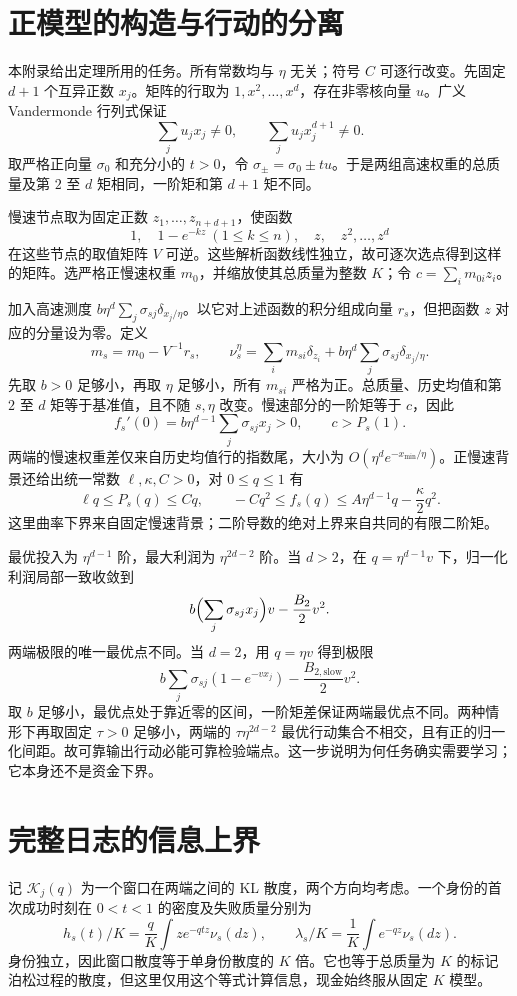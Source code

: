 \section{正模型的构造与行动的分离}\label{app:construction}
本附录给出定理所用的任务。所有常数均与 $\eta$ 无关；符号 $C$ 可逐行改变。先固定 $d+1$ 个互异正数 $x_j$。矩阵的行取为 $1,x^2,\ldots,x^d$，存在非零核向量 $u$。广义 Vandermonde 行列式保证
\[
 \sum_j u_jx_j\ne0,\qquad \sum_j u_jx_j^{d+1}\ne0.
\]
取严格正向量 $\sigma_0$ 和充分小的 $t>0$，令 $\sigma_\pm=\sigma_0\pm tu$。于是两组高速权重的总质量及第 $2$ 至 $d$ 矩相同，一阶矩和第 $d+1$ 矩不同。

慢速节点取为固定正数 $z_1,\ldots,z_{n+d+1}$，使函数
\[
 1,\quad 1-e^{-kz}\ (1\leq k\leq n),\quad z,\quad z^2,\ldots,z^d
\]
在这些节点的取值矩阵 $V$ 可逆。这些解析函数线性独立，故可逐次选点得到这样的矩阵。选严格正慢速权重 $m_0$，并缩放使其总质量为整数 $K$；令 $c=\sum_i m_{0i}z_i$。

加入高速测度 $b\eta^d\sum_j\sigma_{sj}\delta_{x_j/\eta}$。以它对上述函数的积分组成向量 $r_s$，但把函数 $z$ 对应的分量设为零。定义
\[
 m_s=m_0-V^{-1}r_s,\qquad
 \nu_s^\eta=\sum_i m_{si}\delta_{z_i}
          +b\eta^d\sum_j\sigma_{sj}\delta_{x_j/\eta}.
\]
先取 $b>0$ 足够小，再取 $\eta$ 足够小，所有 $m_{si}$ 严格为正。总质量、历史均值和第 $2$ 至 $d$ 矩等于基准值，且不随 $s,\eta$ 改变。慢速部分的一阶矩等于 $c$，因此
\[
 f_s'(0)=b\eta^{d-1}\sum_j\sigma_{sj}x_j>0,
 \qquad c>P_s(1).
\]
两端的慢速权重差仅来自历史均值行的指数尾，大小为 $O(\eta^d e^{-x_{\min}/\eta})$。正慢速背景还给出统一常数 $\ell,\kappa,C>0$，对 $0\leq q\leq1$ 有
\begin{equation}\label{eq:shape}
 \ell q\leq P_s(q)\leq Cq,\qquad
 -Cq^2\leq f_s(q)\leq A\eta^{d-1}q-\frac\kappa2q^2.
\end{equation}
这里曲率下界来自固定慢速背景；二阶导数的绝对上界来自共同的有限二阶矩。

最优投入为 $\eta^{d-1}$ 阶，最大利润为 $\eta^{2d-2}$ 阶。当 $d>2$，在 $q=\eta^{d-1}v$ 下，归一化利润局部一致收敛到
\[
 b\Bigl(\sum_j\sigma_{sj}x_j\Bigr)v-\frac{B_2}2v^2.
\]
两端极限的唯一最优点不同。当 $d=2$，用 $q=\eta v$ 得到极限
\[
 b\sum_j\sigma_{sj}(1-e^{-vx_j})-\frac{B_{2,\mathrm{slow}}}2v^2.
\]
取 $b$ 足够小，最优点处于靠近零的区间，一阶矩差保证两端最优点不同。两种情形下再取固定 $\tau>0$ 足够小，两端的 $\tau\eta^{2d-2}$ 最优行动集合不相交，且有正的归一化间距。故可靠输出行动必能可靠检验端点。这一步说明为何任务确实需要学习；它本身还不是资金下界。

\section{完整日志的信息上界}
记 $\mathcal K_j(q)$ 为一个窗口在两端之间的 KL 散度，两个方向均考虑。一个身份的首次成功时刻在 $0<t<1$ 的密度及失败质量分别为
\[
 h_s(t)/K=\frac qK\int ze^{-qtz}\nu_s(dz),\qquad
 \lambda_s/K=\frac1K\int e^{-qz}\nu_s(dz).
\]
身份独立，因此窗口散度等于单身份散度的 $K$ 倍。它也等于总质量为 $K$ 的标记泊松过程的散度，但这里仅用这个等式计算信息，现金始终服从固定 $K$ 模型。

